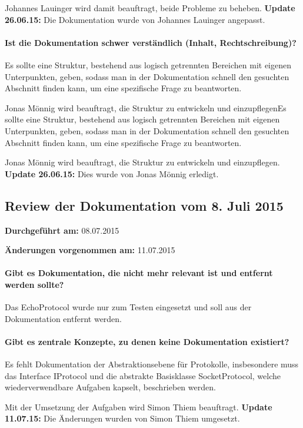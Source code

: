 Johannes Lauinger wird damit beauftragt, beide Probleme zu beheben. \textbf{Update 26.06.15:} Die Dokumentation wurde von Johannes Lauinger angepasst.

\paragraph{Ist die Dokumentation schwer verständlich (Inhalt, Rechtschreibung)?}
Es sollte eine Struktur, bestehend aus logisch getrennten Bereichen mit eigenen Unterpunkten, geben, sodass man in der Dokumentation schnell den gesuchten Abschnitt finden kann, um eine spezifische Frage zu beantworten.

Jonas Mönnig wird beauftragt, die Struktur zu entwickeln und einzupflegenEs sollte eine Struktur, bestehend aus logisch getrennten Bereichen mit eigenen Unterpunkten, geben, sodass man in der Dokumentation schnell den gesuchten Abschnitt finden kann, um eine spezifische Frage zu beantworten.

Jonas Mönnig wird beauftragt, die Struktur zu entwickeln und einzupflegen. \textbf{Update 26.06.15:} Dies wurde von Jonas Mönnig erledigt.


\subsection{Review der Dokumentation vom 8. Juli 2015}

\textbf{Durchgeführt am:} 08.07.2015

\textbf{Änderungen vorgenommen am:} 11.07.2015

\paragraph{Gibt es Dokumentation, die nicht mehr relevant ist und entfernt werden sollte?}
Das EchoProtocol wurde nur zum Testen eingesetzt und soll aus der Dokumentation entfernt werden.

\paragraph{Gibt es zentrale Konzepte, zu denen keine Dokumentation existiert?}
Es fehlt Dokumentation der Abstraktionsebene für Protokolle, insbesondere muss das Interface IProtocol und die abstrakte Basisklasse SocketProtocol, welche wiederverwendbare Aufgaben kapselt, beschrieben werden.

Mit der Umsetzung der Aufgaben wird Simon Thiem beauftragt. \textbf{Update 11.07.15:} Die Änderungen wurden von Simon Thiem umgesetzt.


